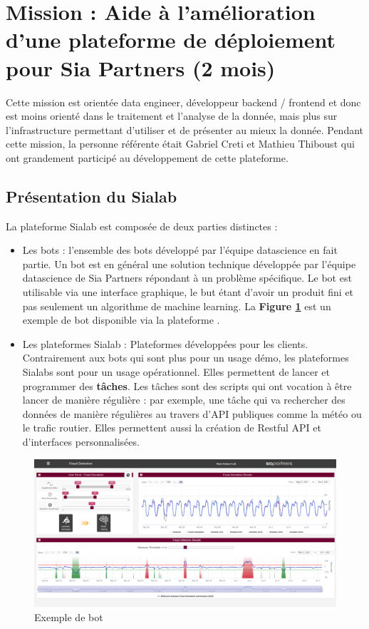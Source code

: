 \documentclass{article} %
\begin{document}
\newpage

\section{Mission : Aide à l'amélioration d'une plateforme de déploiement pour Sia Partners (2 mois)}
Cette mission est orientée data engineer, développeur backend / frontend et donc est moins orienté dans le traitement et l'analyse de la donnée, mais plus sur l'infrastructure permettant d'utiliser et de présenter au mieux la donnée. Pendant cette mission, la personne référente était Gabriel Creti et Mathieu Thiboust qui ont grandement participé au développement de cette plateforme.
 
\subsection{Présentation du Sialab}
La plateforme Sialab est composée de deux parties distinctes :
\begin{itemize}
 \item Les bots : l'ensemble des bots développé par l'équipe datascience en fait partie. Un bot est en général une solution technique développée par l'équipe datascience de Sia Partners répondant à un problème spécifique. Le bot est utilisable via une interface graphique, le but étant d'avoir un produit fini et pas seulement un algorithme de machine learning. La \textbf{Figure \ref{fig:bot}} est un exemple de bot disponible via la plateforme \cite{bot}.
 \item Les plateformes Sialab : Plateformes développées pour les clients. Contrairement aux bots qui sont plus pour un usage démo, les plateformes Sialabs sont pour un usage opérationnel. Elles permettent de lancer et programmer des \textbf{tâches}. Les tâches sont des scripts qui ont vocation à être lancer de manière régulière : par exemple, une tâche qui va rechercher des données de manière régulières au travers d'API publiques comme la météo ou le trafic routier. Elles permettent aussi la création de Restful API et d'interfaces personnalisées.
\end{itemize}

\begin{figure}[!h]
 \centering
 \includegraphics[keepaspectratio = true,scale=0.25]{bot.png}
 \caption{Exemple de bot}
 \label{fig:bot}
\end{figure}
\end{document}
